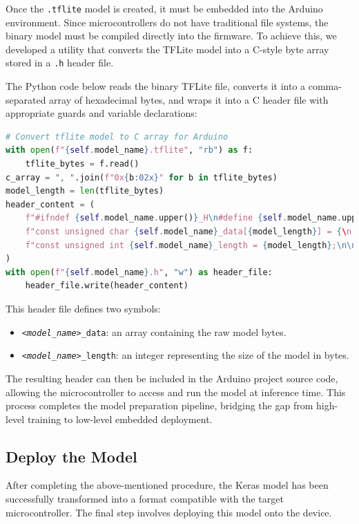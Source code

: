 Once the \texttt{.tflite} model is created, it must be embedded into the Arduino environment. Since microcontrollers do not have traditional file systems, the binary model must be compiled directly into the firmware. To achieve this, we developed a utility that converts the TFLite model into a C-style byte array stored in a \texttt{.h} header file.

The Python code below reads the binary TFLite file, converts it into a comma-separated array of hexadecimal bytes, and wraps it into a C header file with appropriate guards and variable declarations:

\begin{lstlisting}[language=Python, caption={Convert a TFLite model to a C header array for Arduino deployment}, label=lst:tflite_to_c_array]
# Convert tflite model to C array for Arduino
with open(f"{self.model_name}.tflite", "rb") as f:
    tflite_bytes = f.read()
c_array = ", ".join(f"0x{b:02x}" for b in tflite_bytes)
model_length = len(tflite_bytes)
header_content = (
    f"#ifndef {self.model_name.upper()}_H\n#define {self.model_name.upper()}_H\n\n"
    f"const unsigned char {self.model_name}_data[{model_length}] = {\n    {c_array}\n}};\n"
    f"const unsigned int {self.model_name}_length = {model_length};\n\n#endif"
)
with open(f"{self.model_name}.h", "w") as header_file:
    header_file.write(header_content)
\end{lstlisting}

This header file defines two symbols:
\begin{itemize}
    \item \texttt{\textit{<model\_name>}\_data}: an array containing the raw model bytes.
    \item \texttt{\textit{<model\_name>}\_length}: an integer representing the size of the model in bytes.
\end{itemize}

The resulting header can then be included in the Arduino project source code, allowing the microcontroller to access and run the model at inference time. This process completes the model preparation pipeline, bridging the gap from high-level training to low-level embedded deployment.


\subsection{Deploy the Model}

After completing the above-mentioned procedure, the Keras model has been successfully transformed into a format compatible with the target microcontroller. The final step involves deploying this model onto the device.

